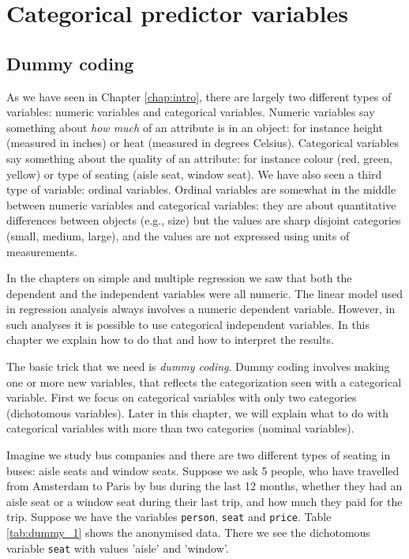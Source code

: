 \chapter{Categorical predictor variables}\label{chap:categorical}



\section{Dummy coding}
As we have seen in Chapter \ref{chap:intro}, there are largely two different types of variables: numeric variables and categorical variables. Numeric variables say something about \textit{how much} of an attribute is in an object: for instance height (measured in inches) or heat (measured in degrees Celsius). Categorical variables say something about the quality of an attribute: for instance colour (red, green, yellow) or type of seating (aisle seat, window seat). We have also seen a third type of variable: ordinal variables. Ordinal variables are somewhat in the middle between numeric variables and categorical variables: they are about quantitative differences between objects (e.g., size) but the values are sharp disjoint categories (small, medium, large), and the values are not expressed using units of measurements.

In the chapters on simple and multiple regression we saw that both the dependent and the independent variables were all numeric. The linear model used in regression analysis always involves a numeric dependent variable. However, in such analyses it is possible to use categorical independent variables. In this chapter we explain how to do that and how to interpret the results. 

The basic trick that we need is \textit{dummy coding}. Dummy coding involves making one or more new variables, that reflects the categorization seen with a categorical variable. First we focus on categorical variables with only two categories (dichotomous variables). Later in this chapter, we will explain what to do with categorical variables with more than two categories (nominal variables). 

Imagine we study bus companies and there are two different types of seating in buses: aisle seats and window seats. Suppose we ask 5 people, who have travelled from Amsterdam to Paris by bus during the last 12 months, whether they had an aisle seat or a window seat during their last trip, and how much they paid for the trip. Suppose we have the variables \texttt{person}, \texttt{seat} and \texttt{price}. Table \ref{tab:dummy_1} shows the anonymised data. There we see the dichotomous variable \texttt{seat} with values 'aisle' and 'window'. 

